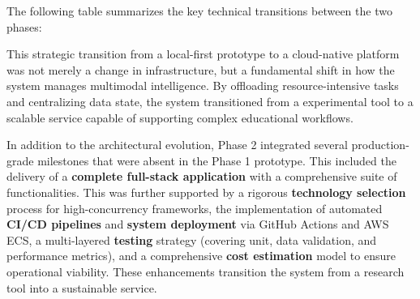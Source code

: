 The following table summarizes the key technical transitions between the two phases:

\begin{table}[H]
    \centering
    \caption{Technical Comparison: Phase 1 (Baseline) vs. Phase 2 (Production).}
    \label{tab:phase_comparison}
\end{table}

This strategic transition from a local-first prototype to a cloud-native platform was not merely a change in infrastructure, but a fundamental shift in how the system manages multimodal intelligence. By offloading resource-intensive tasks and centralizing data state, the system transitioned from a experimental tool to a scalable service capable of supporting complex educational workflows.

In addition to the architectural evolution, Phase 2 integrated several production-grade milestones that were absent in the Phase 1 prototype. This included the delivery of a \textbf{complete full-stack application} with a comprehensive suite of functionalities. This was further supported by a rigorous \textbf{technology selection} process for high-concurrency frameworks, the implementation of automated \textbf{CI/CD pipelines} and \textbf{system deployment} via GitHub Actions and AWS ECS, a multi-layered \textbf{testing} strategy (covering unit, data validation, and performance metrics), and a comprehensive \textbf{cost estimation} model to ensure operational viability. These enhancements transition the system from a research tool into a sustainable service.

